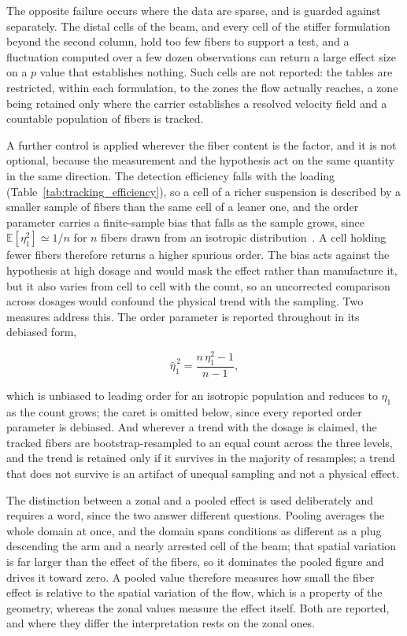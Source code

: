 \documentclass[%
  aip,
  pof,          %
  reprint,      %
  floatfix
]{revtex4-2}
\begin{document}
The opposite failure occurs where the data are sparse, and is guarded against separately. The distal cells of the beam, and every cell of the stiffer formulation beyond the second column, hold too few fibers to support a test, and a fluctuation computed over a few dozen observations can return a large effect size on a $p$ value that establishes nothing. Such cells are not reported: the tables are restricted, within each formulation, to the zones the flow actually reaches, a zone being retained only where the carrier establishes a resolved velocity field and a countable population of fibers is tracked.

A further control is applied wherever the fiber content is the factor, and it is not optional, because the measurement and the hypothesis act on the same quantity in the same direction. The detection efficiency falls with the loading (Table~\ref{tab:tracking_efficiency}), so a cell of a richer suspension is described by a smaller sample of fibers than the same cell of a leaner one, and the order parameter carries a finite-sample bias that falls as the sample grows, since $\mathbb{E}[\eta_1^2] \simeq 1/n$ for $n$ fibers drawn from an isotropic distribution~\cite{mardia2000directional}. A cell holding fewer fibers therefore returns a higher spurious order. The bias acts against the hypothesis at high dosage and would mask the effect rather than manufacture it, but it also varies from cell to cell with the count, so an uncorrected comparison across dosages would confound the physical trend with the sampling. Two measures address this. The order parameter is reported throughout in its debiased form,

\begin{equation}
    \hat{\eta}_1^{\,2} = \frac{n\,\eta_1^2 - 1}{n - 1},
    \label{eq:eta_debiased}
\end{equation}

which is unbiased to leading order for an isotropic population and reduces to $\eta_1$ as the count grows; the caret is omitted below, since every reported order parameter is debiased. And wherever a trend with the dosage is claimed, the tracked fibers are bootstrap-resampled to an equal count across the three levels, and the trend is retained only if it survives in the majority of resamples; a trend that does not survive is an artifact of unequal sampling and not a physical effect.

The distinction between a zonal and a pooled effect is used deliberately and requires a word, since the two answer different questions. Pooling averages the whole domain at once, and the domain spans conditions as different as a plug descending the arm and a nearly arrested cell of the beam; that spatial variation is far larger than the effect of the fibers, so it dominates the pooled figure and drives it toward zero. A pooled value therefore measures how small the fiber effect is relative to the spatial variation of the flow, which is a property of the geometry, whereas the zonal values measure the effect itself. Both are reported, and where they differ the interpretation rests on the zonal ones.
\end{document}
